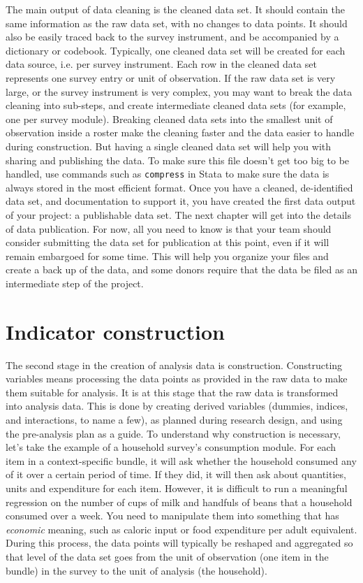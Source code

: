 The main output of data cleaning is the cleaned data set. 
It should contain the same information as the raw data set,
with no changes to data points.
It should also be easily traced back to the survey instrument,
and be accompanied by a dictionary or codebook.
Typically, one cleaned data set will be created for each data source,
i.e. per survey instrument.
Each row in the cleaned data set represents one survey entry or unit of observation.
If the raw data set is very large, or the survey instrument is very complex,
you may want to break the data cleaning into sub-steps, 
and create intermediate cleaned data sets
(for example, one per survey module).
Breaking cleaned data sets into the smallest unit of observation inside a roster
make the cleaning faster and the data easier to handle during construction.
But having a single cleaned data set will help you with sharing and publishing the data.
To make sure this file doesn't get too big to be handled,
use commands such as \texttt{compress} in Stata to make sure the data
is always stored in the most efficient format.
Once you have a cleaned, de-identified data set, and documentation to support it, 
you have created the first data output of your project:
a publishable data set.
The next chapter will get into the details of data publication.
For now, all you need to know is that your team should consider submitting the data set for publication at this point,
even if it will remain embargoed for some time.
This will help you organize your files and create a back up of the data,
and some donors require that the data be filed as an intermediate step of the project.

\section{Indicator construction}

The second stage in the creation of analysis data is construction.
Constructing variables means processing the data points as provided in the raw data to make them suitable for analysis.
It is at this stage that the raw data is transformed into analysis data.
This is done by creating derived variables (dummies, indices, and interactions, to name a few), 
as planned during research design, and using the pre-analysis plan as a guide.
To understand why construction is necessary,
let's take the example of a household survey's consumption module.
For each item in a context-specific bundle, it will ask whether the household consumed any of it over a certain period of time.
If they did, it will then ask about quantities, units and expenditure for each item.
However, it is difficult to run a meaningful regression on the number of cups of milk and handfuls of beans that a household consumed over a week.
You need to manipulate them into something that has \textit{economic} meaning,
such as caloric input or food expenditure per adult equivalent. 
During this process, the data points will typically be reshaped and aggregated 
so that level of the data set goes from the unit of observation (one item in the bundle) in the survey to the unit of analysis (the household). 

